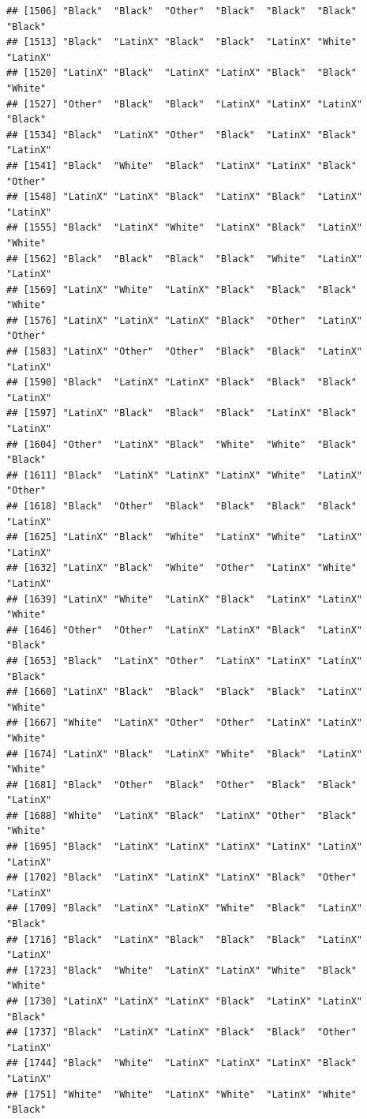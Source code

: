 \documentclass[]{book}
\begin{document}
\begin{verbatim}
## [1506] "Black"  "Black"  "Other"  "Black"  "Black"  "Black"  "Black" 
## [1513] "Black"  "LatinX" "Black"  "Black"  "LatinX" "White"  "LatinX"
## [1520] "LatinX" "Black"  "LatinX" "LatinX" "Black"  "Black"  "White" 
## [1527] "Other"  "Black"  "Black"  "LatinX" "LatinX" "LatinX" "Black" 
## [1534] "Black"  "LatinX" "Other"  "Black"  "LatinX" "Black"  "LatinX"
## [1541] "Black"  "White"  "Black"  "LatinX" "LatinX" "Black"  "Other" 
## [1548] "LatinX" "LatinX" "Black"  "LatinX" "Black"  "LatinX" "LatinX"
## [1555] "Black"  "LatinX" "White"  "LatinX" "Black"  "LatinX" "White" 
## [1562] "Black"  "Black"  "Black"  "Black"  "White"  "LatinX" "LatinX"
## [1569] "LatinX" "White"  "LatinX" "Black"  "Black"  "Black"  "White" 
## [1576] "LatinX" "LatinX" "LatinX" "Black"  "Other"  "LatinX" "Other" 
## [1583] "LatinX" "Other"  "Other"  "Black"  "Black"  "LatinX" "LatinX"
## [1590] "Black"  "LatinX" "LatinX" "Black"  "Black"  "Black"  "LatinX"
## [1597] "LatinX" "Black"  "Black"  "Black"  "LatinX" "Black"  "LatinX"
## [1604] "Other"  "LatinX" "Black"  "White"  "White"  "Black"  "Black" 
## [1611] "Black"  "LatinX" "LatinX" "LatinX" "White"  "LatinX" "Other" 
## [1618] "Black"  "Other"  "Black"  "Black"  "Black"  "Black"  "LatinX"
## [1625] "LatinX" "Black"  "White"  "LatinX" "White"  "LatinX" "LatinX"
## [1632] "LatinX" "Black"  "White"  "Other"  "LatinX" "White"  "LatinX"
## [1639] "LatinX" "White"  "LatinX" "Black"  "LatinX" "LatinX" "White" 
## [1646] "Other"  "Other"  "LatinX" "LatinX" "Black"  "LatinX" "Black" 
## [1653] "Black"  "LatinX" "Other"  "LatinX" "LatinX" "LatinX" "Black" 
## [1660] "LatinX" "Black"  "Black"  "Black"  "Black"  "LatinX" "White" 
## [1667] "White"  "LatinX" "Other"  "Other"  "LatinX" "LatinX" "White" 
## [1674] "LatinX" "Black"  "LatinX" "White"  "Black"  "LatinX" "White" 
## [1681] "Black"  "Other"  "Black"  "Other"  "Black"  "Black"  "LatinX"
## [1688] "White"  "LatinX" "Black"  "LatinX" "Other"  "Black"  "White" 
## [1695] "Black"  "LatinX" "LatinX" "LatinX" "LatinX" "LatinX" "LatinX"
## [1702] "Black"  "LatinX" "LatinX" "LatinX" "Black"  "Other"  "LatinX"
## [1709] "Black"  "LatinX" "LatinX" "White"  "Black"  "LatinX" "Black" 
## [1716] "Black"  "LatinX" "Black"  "Black"  "Black"  "LatinX" "LatinX"
## [1723] "Black"  "White"  "LatinX" "LatinX" "White"  "Black"  "White" 
## [1730] "LatinX" "LatinX" "LatinX" "Black"  "LatinX" "LatinX" "Black" 
## [1737] "Black"  "LatinX" "LatinX" "Black"  "Black"  "Other"  "LatinX"
## [1744] "Black"  "White"  "LatinX" "LatinX" "LatinX" "Black"  "LatinX"
## [1751] "White"  "White"  "LatinX" "White"  "LatinX" "White"  "Black" 

\end{verbatim}
\end{document}
